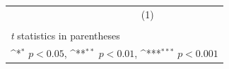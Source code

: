 {
\def\sym#1{\ifmmode^{#1}\else\(^{#1}\)\fi}
\begin{tabular}{l*{1}{c}}
\hline\hline
                    &\multicolumn{1}{c}{(1)}\\
                    &\multicolumn{1}{c}{} \\
\hline
\hline\hline
\multicolumn{2}{l}{\footnotesize \textit{t} statistics in parentheses}\\
\multicolumn{2}{l}{\footnotesize \sym{*} \(p<0.05\), \sym{**} \(p<0.01\), \sym{***} \(p<0.001\)}\\
\end{tabular}
}
